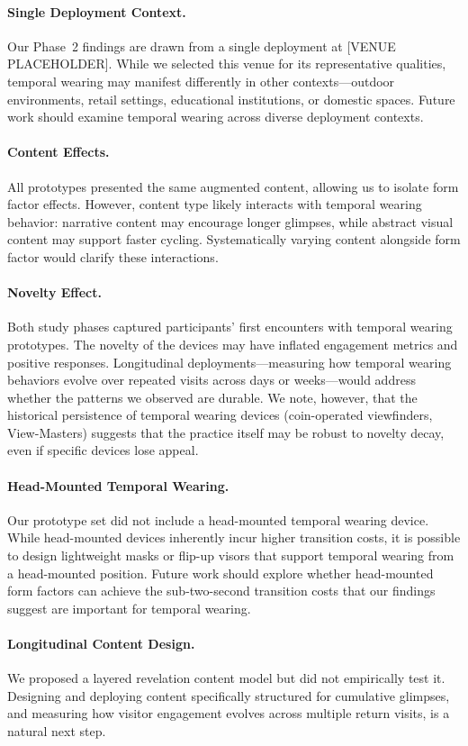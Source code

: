 \paragraph{Single Deployment Context.}
Our Phase~2 findings are drawn from a single deployment at [VENUE PLACEHOLDER]. While we selected this venue for its representative qualities, temporal wearing may manifest differently in other contexts---outdoor environments, retail settings, educational institutions, or domestic spaces. Future work should examine temporal wearing across diverse deployment contexts.

\paragraph{Content Effects.}
All prototypes presented the same augmented content, allowing us to isolate form factor effects. However, content type likely interacts with temporal wearing behavior: narrative content may encourage longer glimpses, while abstract visual content may support faster cycling. Systematically varying content alongside form factor would clarify these interactions.

\paragraph{Novelty Effect.}
Both study phases captured participants' first encounters with temporal wearing prototypes. The novelty of the devices may have inflated engagement metrics and positive responses. Longitudinal deployments---measuring how temporal wearing behaviors evolve over repeated visits across days or weeks---would address whether the patterns we observed are durable. We note, however, that the historical persistence of temporal wearing devices (coin-operated viewfinders, View-Masters) suggests that the practice itself may be robust to novelty decay, even if specific devices lose appeal.

\paragraph{Head-Mounted Temporal Wearing.}
Our prototype set did not include a head-mounted temporal wearing device. While head-mounted devices inherently incur higher transition costs, it is possible to design lightweight masks or flip-up visors that support temporal wearing from a head-mounted position. Future work should explore whether head-mounted form factors can achieve the sub-two-second transition costs that our findings suggest are important for temporal wearing.

\paragraph{Longitudinal Content Design.}
We proposed a layered revelation content model but did not empirically test it. Designing and deploying content specifically structured for cumulative glimpses, and measuring how visitor engagement evolves across multiple return visits, is a natural next step.
